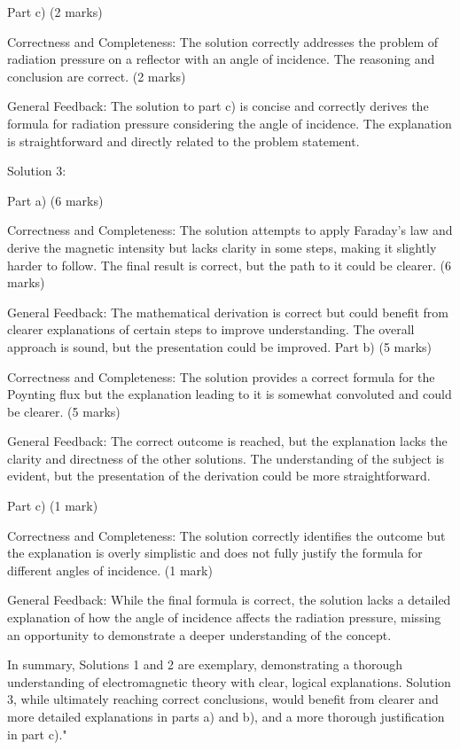 \documentclass[a4paper,11pt]{article}
\begin{document}
Part c) (2 marks)

Correctness and Completeness: The solution correctly addresses the problem of radiation pressure on a reflector with an angle of incidence. The reasoning and conclusion are correct. (2 marks)

General Feedback: The solution to part c) is concise and correctly derives the formula for radiation pressure considering the angle of incidence. The explanation is straightforward and directly related to the problem statement.

Solution 3:

Part a) (6 marks)

Correctness and Completeness: The solution attempts to apply Faraday's law and derive the magnetic intensity but lacks clarity in some steps, making it slightly harder to follow. The final result is correct, but the path to it could be clearer. (6 marks)

General Feedback: The mathematical derivation is correct but could benefit from clearer explanations of certain steps to improve understanding. The overall approach is sound, but the presentation could be improved.
Part b) (5 marks)

Correctness and Completeness: The solution provides a correct formula for the Poynting flux but the explanation leading to it is somewhat convoluted and could be clearer. (5 marks)

General Feedback: The correct outcome is reached, but the explanation lacks the clarity and directness of the other solutions. The understanding of the subject is evident, but the presentation of the derivation could be more straightforward.

Part c) (1 mark)

Correctness and Completeness: The solution correctly identifies the outcome but the explanation is overly simplistic and does not fully justify the formula for different angles of incidence. (1 mark)

General Feedback: While the final formula is correct, the solution lacks a detailed explanation of how the angle of incidence affects the radiation pressure, missing an opportunity to demonstrate a deeper understanding of the concept.

In summary, Solutions 1 and 2 are exemplary, demonstrating a thorough understanding of electromagnetic theory with clear, logical explanations. Solution 3, while ultimately reaching correct conclusions, would benefit from clearer and more detailed explanations in parts a) and b), and a more thorough justification in part c)."
\end{document}
